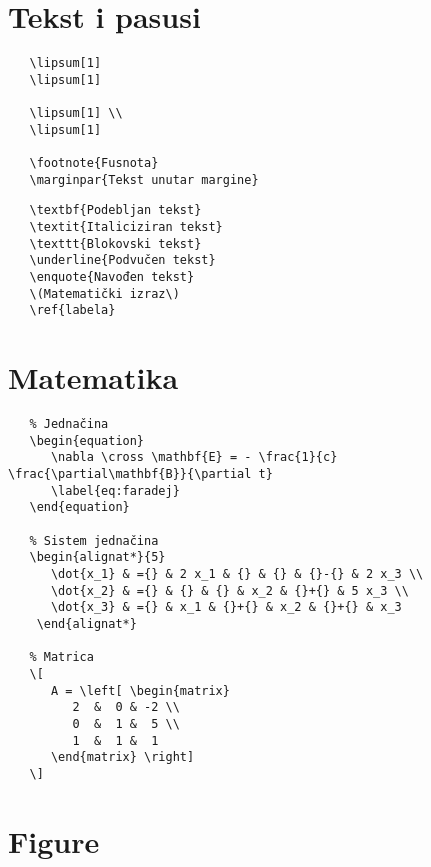 \documentclass[a4paper]{article}
\begin{document}
\pagebreak

\section*{Tekst i pasusi}

\begin{verbatim}
   \lipsum[1]
   \lipsum[1]

   \lipsum[1] \\
   \lipsum[1]

   \footnote{Fusnota}
   \marginpar{Tekst unutar margine}
\end{verbatim}

\begin{verbatim}
   \textbf{Podebljan tekst}
   \textit{Italiciziran tekst}
   \texttt{Blokovski tekst}
   \underline{Podvučen tekst}
   \enquote{Navođen tekst}
   \(Matematički izraz\)
   \ref{labela}
\end{verbatim}

\pagebreak

\section*{Matematika}

\begin{verbatim}
   % Jednačina
   \begin{equation}
      \nabla \cross \mathbf{E} = - \frac{1}{c} \frac{\partial\mathbf{B}}{\partial t}
      \label{eq:faradej}
   \end{equation}

   % Sistem jednačina
   \begin{alignat*}{5}
      \dot{x_1} & ={} & 2 x_1 & {} & {} & {}-{} & 2 x_3 \\
      \dot{x_2} & ={} & {} & {} & x_2 & {}+{} & 5 x_3 \\
      \dot{x_3} & ={} & x_1 & {}+{} & x_2 & {}+{} & x_3
    \end{alignat*}

   % Matrica
   \[
      A = \left[ \begin{matrix}
         2  &  0 & -2 \\
         0  &  1 &  5 \\
         1  &  1 &  1
      \end{matrix} \right]
   \]
\end{verbatim}

\pagebreak

\section*{Figure}
\end{document}

